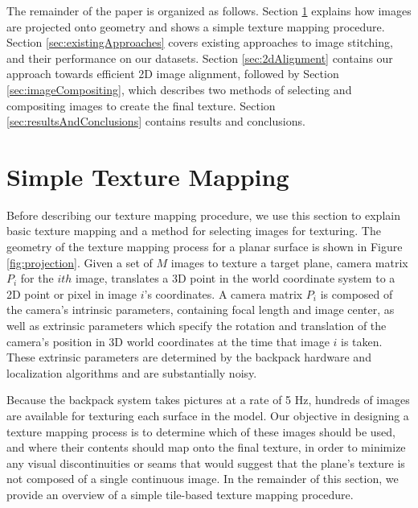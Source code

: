 \documentclass[]{spie}  %
\begin{document}
The remainder of the paper is organized as follows. Section
\ref{sec:simpleTextureMapping} explains how images are projected onto
geometry and shows a simple texture mapping procedure. Section
\ref{sec:existingApproaches} covers existing approaches to image
stitching, and their performance on our datasets. Section
\ref{sec:2dAlignment} contains our approach towards efficient 2D image
alignment, followed by Section \ref{sec:imageCompositing}, which
describes two methods of selecting and compositing images to create
the final texture. Section \ref{sec:resultsAndConclusions} contains
results and conclusions.





\section{Simple Texture Mapping}
\label{sec:simpleTextureMapping}

Before describing our texture mapping procedure, we use this section
to explain basic texture mapping and a method for selecting images for
texturing. The geometry of the texture mapping process for a planar
surface is shown in Figure \ref{fig:projection}.  Given a set of $M$
images to texture a target plane, camera matrix $P_i$ for the $ith$
image, translates a 3D point in the world coordinate system to a 2D
point or pixel in image $i$'s coordinates. A camera matrix $P_i$ is
composed of the camera's intrinsic parameters, containing focal length
and image center, as well as extrinsic parameters which specify the
rotation and translation of the camera's position in 3D world
coordinates at the time that image $i$ is taken. These extrinsic
parameters are determined by the backpack hardware and localization
algorithms \cite{chen2010indoor, liu2010indoor, kua2012loopclosure}
and are substantially noisy.

Because the backpack system takes pictures at a rate of 5 Hz, hundreds
of images are available for texturing each surface in the model. Our
objective in designing a texture mapping process is to determine which
of these images should be used, and where their contents should map
onto the final texture, in order to minimize any visual
discontinuities or seams that would suggest that the plane's texture
is not composed of a single continuous image. In the remainder of this
section, we provide an overview of a simple tile-based texture mapping
procedure.
\end{document}
